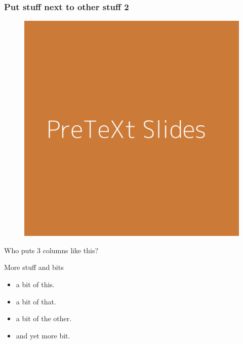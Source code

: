 \documentclass[11pt, compress]{beamer}
\begin{document}
\begin{frame}
\frametitle{Put stuff next to other stuff 2}
 \begin{tcbraster}[arc=0pt, raster columns=3, raster equal height=rows, raster force size=false, raster column skip=0ex] 
\pause 
\begin{tcolorbox}[valign=top, width=0.333333333333333\textwidth]

\begin{figure}\centering\includegraphics[width=1\linewidth]{img/500-cc7a37.png}
\end{figure}\end{tcolorbox}
 \pause 
\begin{tcolorbox}[valign=top, width=0.333333333333333\textwidth]

Who puts 3 columns like this?\end{tcolorbox}
 \pause 
\begin{tcolorbox}[valign=top, width=0.333333333333333\textwidth]

More stuff and bits \begin{itemize}
\item{}
a bit of this.

\item{}
a bit of that.

\item{}
a bit of the other.

\item{}
and yet more bit.
\end{itemize}\end{tcolorbox}
 \end{tcbraster} 
\end{frame}
 
\end{document}
